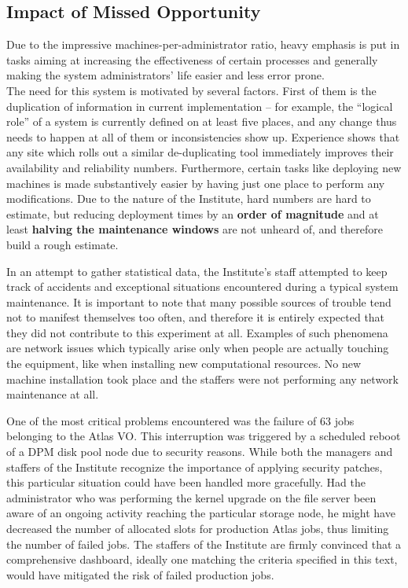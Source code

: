 \documentclass[12pt]{article}
\begin{document}
\subsection{Impact of Missed Opportunity}
Due to the impressive machines-per-administrator ratio, heavy emphasis is put in tasks aiming at increasing the effectiveness
of certain processes and generally making the system administrators' life easier and less error prone.\\
The need for this system is motivated by several factors.  First of them is the duplication of information in current
implementation -- for example, the ``logical role'' of a system is currently defined on at least five places, and any change thus
needs to happen at all of them or inconsistencies show up.  Experience shows that any site which rolls out a similar
de-duplicating tool immediately improves their availability and reliability numbers.  Furthermore, certain tasks like deploying
new machines is made substantively easier by having just one place to perform any modifications.  Due to the nature of the
Institute, hard numbers are hard to estimate, but reducing deployment times by an {\bf order of magnitude} and at least {\bf
halving the maintenance windows} are not unheard of, and therefore build a rough estimate.

In an attempt to gather statistical data, the Institute's staff attempted to keep track of accidents and exceptional situations
encountered during a typical system maintenance.  It is important to note that many possible sources of trouble tend not to
manifest themselves too often, and therefore it is entirely expected that they did not contribute to this experiment at all.
Examples of such phenomena are network issues which typically arise only when people are actually touching the equipment, like
when installing new computational resources.  No new machine installation took place and the staffers were not performing any
network maintenance at all.

One of the most critical problems encountered was the failure of 63 jobs belonging to the Atlas VO.  This interruption was
triggered by a scheduled reboot of a DPM disk pool node due to security reasons.  While both the managers and staffers of the
Institute recognize the importance of applying security patches, this particular situation could have been handled more
gracefully.  Had the administrator who was performing the kernel upgrade on the file server been aware of an ongoing activity
reaching the particular storage node, he might have decreased the number of allocated slots for production Atlas jobs, thus
limiting the number of failed jobs.  The staffers of the Institute are firmly convinced that a comprehensive dashboard, ideally
one matching the criteria specified in this text, would have mitigated the risk of failed production jobs.
\end{document}
